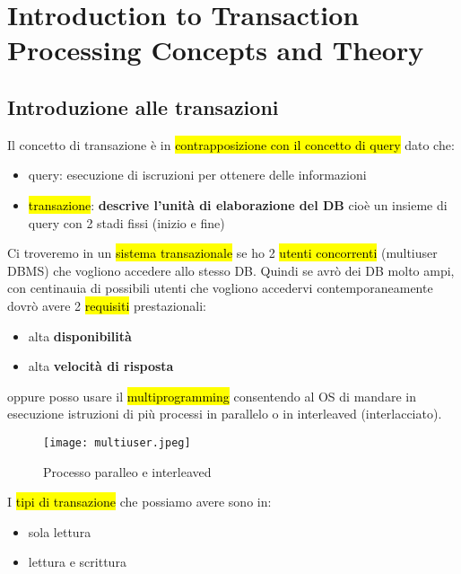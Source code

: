 \newpage
\section{Introduction to Transaction Processing Concepts and Theory}


\subsection{Introduzione alle transazioni}

Il concetto di transazione è in \hl{contrapposizione con il concetto di query} dato che:

\begin{itemize}
    \item query: esecuzione di iscruzioni per ottenere delle informazioni
    \item \hl{transazione}: \textbf{descrive l'unità di elaborazione del DB} cioè un insieme di query con 2 stadi fissi (inizio e fine)
\end{itemize}

Ci troveremo in un \hl{sistema transazionale} se ho 2 \hl{utenti concorrenti} (multiuser DBMS) che vogliono accedere allo stesso DB. Quindi se avrò dei DB molto ampi, con centinauia di possibili utenti che vogliono accedervi contemporaneamente dovrò avere 2 \hl{requisiti} prestazionali:

\begin{itemize}
    \item alta \textbf{disponibilità}
    \item alta \textbf{velocità di risposta}
\end{itemize}

oppure posso usare il \hl{multiprogramming} consentendo al OS di mandare in esecuzione istruzioni di più processi in parallelo o in interleaved (interlacciato).


\begin{figure}[H]
\centering
\texttt{[image: multiuser.jpeg]}
\caption{Processo paralleo e interleaved} 
\label{multiuser}
\end{figure}


I \hl{tipi di transazione} che possiamo avere sono in:

\begin{itemize}
    \item sola lettura
    \item lettura e scrittura
\end{itemize}

